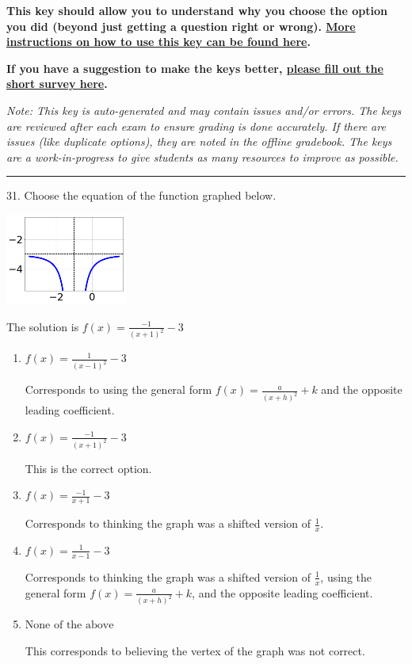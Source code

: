 \documentclass{extbook}[14pt]
\begin{document}
\textbf{This key should allow you to understand why you choose the option you did (beyond just getting a question right or wrong). \href{https://xronos.clas.ufl.edu/mac1105spring2020/courseDescriptionAndMisc/Exams/LearningFromResults}{More instructions on how to use this key can be found here}.}

\textbf{If you have a suggestion to make the keys better, \href{https://forms.gle/CZkbZmPbC9XALEE88}{please fill out the short survey here}.}

\textit{Note: This key is auto-generated and may contain issues and/or errors. The keys are reviewed after each exam to ensure grading is done accurately. If there are issues (like duplicate options), they are noted in the offline gradebook. The keys are a work-in-progress to give students as many resources to improve as possible.}

\rule{\textwidth}{0.4pt}

31. Choose the equation of the function graphed below.
\begin{center} \includegraphics[width=0.3\textwidth]{../Figures/rationalGraphToEquationA.png} \end{center} 

The solution is $ f(x) = \frac{-1}{(x + 1)^2} - 3 $ 

\begin{enumerate}[label=\Alph*.] 
\item $ f(x) = \frac{1}{(x - 1)^2} - 3 $ 

 Corresponds to using the general form $f(x) = \frac{a}{(x+h)^2}+k$ and the opposite leading coefficient. 
\item $ f(x) = \frac{-1}{(x + 1)^2} - 3 $ 

 This is the correct option. 
\item $ f(x) = \frac{-1}{x + 1} - 3 $ 

 Corresponds to thinking the graph was a shifted version of $\frac{1}{x}$. 
\item $ f(x) = \frac{1}{x - 1} - 3 $ 

 Corresponds to thinking the graph was a shifted version of $\frac{1}{x}$, using the general form $f(x) = \frac{a}{(x+h)^2}+k$, and the opposite leading coefficient. 
\item $ \text{None of the above} $ 

 This corresponds to believing the vertex of the graph was not correct. 
\end{enumerate} 
 
\end{document}
